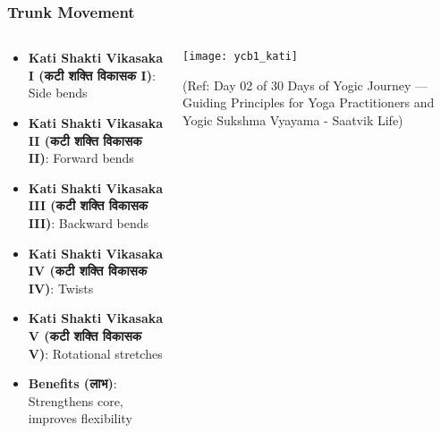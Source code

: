 \begin{frame}[fragile]\frametitle{Trunk Movement}
\begin{columns}
    \begin{column}[T]{0.5\linewidth}
      \begin{itemize}
		\item \textbf{Kati Shakti Vikasaka I (कटी शक्ति विकासक I)}: Side bends
		\item \textbf{Kati Shakti Vikasaka II (कटी शक्ति विकासक II)}: Forward bends
		\item \textbf{Kati Shakti Vikasaka III (कटी शक्ति विकासक III)}: Backward bends
		\item \textbf{Kati Shakti Vikasaka IV (कटी शक्ति विकासक IV)}: Twists
		\item \textbf{Kati Shakti Vikasaka V (कटी शक्ति विकासक V)}: Rotational stretches
		\item \textbf{Benefits (लाभ)}: Strengthens core, improves flexibility
	  \end{itemize}
    \end{column}
    \begin{column}[T]{0.5\linewidth}
		\begin{center}
		        \texttt{[image: ycb1\_kati]}
				
				{\tiny (Ref: Day 02 of 30 Days of Yogic Journey — Guiding Principles for Yoga Practitioners and Yogic Sukshma Vyayama - Saatvik Life)}	
		\end{center}	
    \end{column}
\end{columns}
\end{frame}

